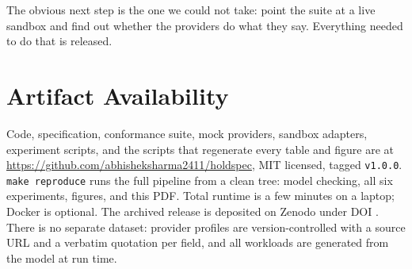 \documentclass[conference]{IEEEtran}
\newcommand{\code}[1]{\texttt{\small #1}}
\begin{document}
The obvious next step is the one we could not take: point the suite at a live
sandbox and find out whether the providers do what they say. Everything needed to
do that is released.

\section*{Artifact Availability}

Code, specification, conformance suite, mock providers, sandbox adapters,
experiment scripts, and the scripts that regenerate every table and figure are
at \url{https://github.com/abhisheksharma2411/holdspec}, MIT licensed, tagged
\code{v1.0.0}. \code{make reproduce} runs the full pipeline from a clean tree:
model checking, all six experiments, figures, and this PDF. Total runtime is a
few minutes on a laptop; Docker is optional. The archived release is deposited on
Zenodo under DOI \texttt{\zenodocode}. There is no separate dataset: provider
profiles are version-controlled with a source URL and a verbatim quotation per
field, and all workloads are generated from the model at run time.



\end{document}
